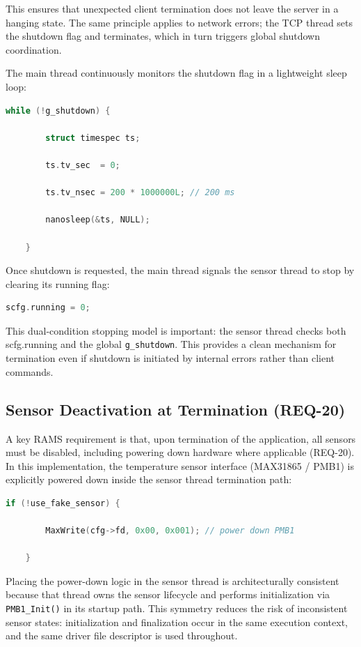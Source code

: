 This ensures that unexpected client termination does not leave the server in a hanging state. The same principle applies to network errors; the TCP thread sets the shutdown flag and terminates, which in turn triggers global shutdown coordination.

The main thread continuously monitors the shutdown flag in a lightweight sleep loop:

\begin{lstlisting}[language=C]
	while (!g_shutdown) {
		
		struct timespec ts;
		
		ts.tv_sec  = 0;
		
		ts.tv_nsec = 200 * 1000000L; // 200 ms
		
		nanosleep(&ts, NULL);
		
	}
\end{lstlisting}

Once shutdown is requested, the main thread signals the sensor thread to stop by clearing its running flag:

\begin{lstlisting}[language=C]
	scfg.running = 0;
\end{lstlisting}

This dual-condition stopping model is important: the sensor thread checks both scfg.running and the global \texttt{g\_shutdown}. This provides a clean mechanism for termination even if shutdown is initiated by internal errors rather than client commands.

\subsection{Sensor Deactivation at Termination (REQ-20)}

A key RAMS requirement is that, upon termination of the application, all sensors must be disabled, including powering down hardware where applicable (REQ-20). In this implementation, the temperature sensor interface (MAX31865 / PMB1) is explicitly powered down inside the sensor thread termination path:

\begin{lstlisting}[language=C]
	if (!use_fake_sensor) {
		
		MaxWrite(cfg->fd, 0x00, 0x001); // power down PMB1
		
	}
\end{lstlisting}

Placing the power-down logic in the sensor thread is architecturally consistent because that thread owns the sensor lifecycle and performs initialization via \texttt{PMB1\_Init()} in its startup path. This symmetry reduces the risk of inconsistent sensor states: initialization and finalization occur in the same execution context, and the same driver file descriptor is used throughout.

